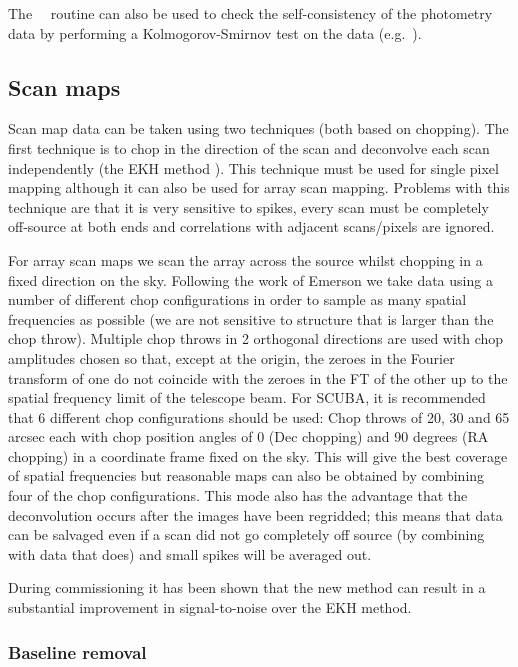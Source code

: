 \documentclass[twoside,11pt]{starlink}
\providecommand{\Kappa}{\xref{{\textsc{Kappa}}}{sun95}{}}
\providecommand{\task}[1]{#1}
\providecommand{\kstest}{\xref{\task{kstest}}{sun95}{KSTEST}}
\begin{document}
The \Kappa\ \kstest\ routine can also be used to check the
self-consistency of the photometry data by performing a Kolmogorov-Smirnov
test on the data (e.g.\ \cite{dhh}).


\subsection{Scan maps}

Scan map data can be taken using two techniques (both based on chopping).  The
first technique is to chop in the direction of the scan and deconvolve each
scan independently (the EKH method \cite{ekh}).  This technique must be used
for single pixel mapping although it can also be used for array scan mapping.
Problems with this technique are that it is very sensitive to spikes,
every scan must be completely off-source at both ends and correlations
with adjacent scans/pixels are ignored.

For array scan maps we scan the array across the source whilst chopping in a
fixed direction on the sky. Following the work of Emerson\cite{EII} we take
data using a number of different chop configurations in order to sample as
many spatial frequencies as possible (we are not sensitive to structure that
is larger than the chop throw). Multiple chop throws in 2 orthogonal
directions are used with chop amplitudes chosen so that, except at the origin,
the zeroes in the Fourier transform of one do not coincide with the zeroes in
the FT of the other up to the spatial frequency limit of the telescope
beam. For SCUBA, it is recommended that 6 different chop configurations should
be used: Chop throws of 20, 30 and 65 arcsec each with chop position angles of
0 (Dec chopping) and 90 degrees (RA chopping) in a coordinate frame fixed on
the sky. This will give the best coverage of spatial frequencies but reasonable
maps can also be obtained by combining four of the chop configurations.
This mode also has the advantage that the deconvolution occurs after the
images have been regridded; this means that data can be salvaged even if
a scan did not go completely off source (by combining with data that does)
and small spikes will be averaged out.

During commissioning it has been shown that the new method can result in
a substantial improvement in signal-to-noise over the EKH
method\cite{spietj}.

\subsubsection{Baseline removal}
\end{document}
